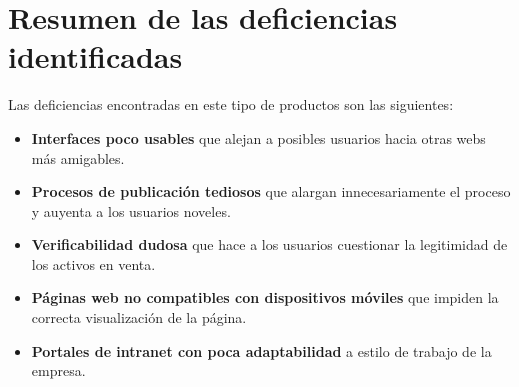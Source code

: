 \section{Resumen de las deficiencias identificadas}
\par Las deficiencias encontradas en este tipo de productos son las siguientes:
\begin{itemize}
	\item \textbf{Interfaces poco usables} que alejan a posibles usuarios hacia otras webs más amigables.
	\item \textbf{Procesos de publicación tediosos} que alargan innecesariamente el proceso y auyenta a los usuarios noveles.
	\item \textbf{Verificabilidad dudosa} que hace a los usuarios cuestionar la legitimidad de los activos en venta.
	\item \textbf{Páginas web no compatibles con dispositivos móviles} que impiden la correcta visualización de la página.
	\item \textbf{Portales de intranet con poca adaptabilidad} a estilo de trabajo de la empresa.
\end{itemize}

